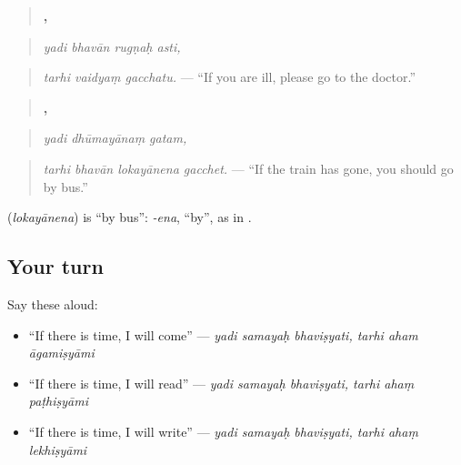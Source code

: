 \begin{quote}
\textbf{   ,}
\end{quote}

\begin{quote}
\emph{yadi bhavān rugṇaḥ asti,}
\end{quote}

\begin{quote}
\textbf{  }
\end{quote}

\begin{quote}
\emph{tarhi vaidyaṃ gacchatu.} — \textquotedblleft{}If you are ill, please go to the doctor.\textquotedblright{}
\end{quote}

\begin{quote}
\textbf{  ,}
\end{quote}

\begin{quote}
\emph{yadi dhūmayānaṃ gatam,}
\end{quote}

\begin{quote}
\textbf{   }
\end{quote}

\begin{quote}
\emph{tarhi bhavān lokayānena gacchet.} — \textquotedblleft{}If the train has gone, you should go by bus.\textquotedblright{}
\end{quote}

\textbf{} (\emph{lokayānena}) is \textquotedblleft{}by bus\textquotedblright{}: \emph{-ena}, \textquotedblleft{}by\textquotedblright{}, as in \textbf{}.

\subsection*{Your turn}
Say these aloud:

\begin{itemize}
\raggedright
  \item \textquotedblleft{}If there is time, I will come\textquotedblright{} — \emph{yadi samayaḥ bhaviṣyati, tarhi aham āgamiṣyāmi}
  \item \textquotedblleft{}If there is time, I will read\textquotedblright{} — \emph{yadi samayaḥ bhaviṣyati, tarhi ahaṃ paṭhiṣyāmi}
  \item \textquotedblleft{}If there is time, I will write\textquotedblright{} — \emph{yadi samayaḥ bhaviṣyati, tarhi ahaṃ lekhiṣyāmi}
\end{itemize}

